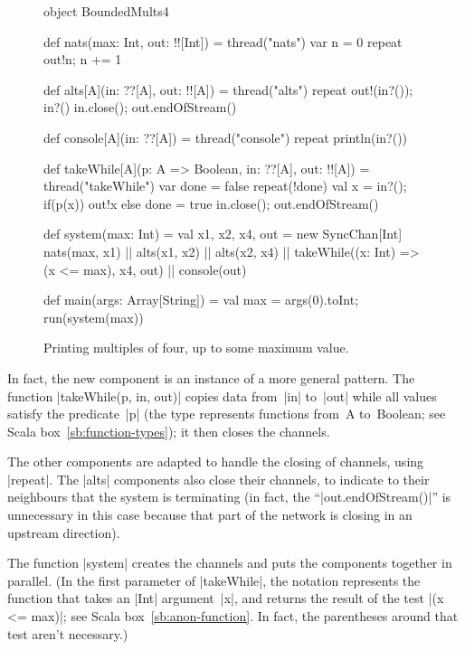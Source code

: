 
\begin{figure}
\begin{scala}
object BoundedMults4{
  def nats(max: Int, out: !![Int]) = thread("nats"){ 
    var n = 0
    repeat{ out!n; n += 1 }
  }

  def alts[A](in: ??[A], out: !![A]) = thread("alts"){ 
    repeat{ out!(in?()); in?() }
    in.close(); out.endOfStream()
  }

  def console[A](in: ??[A]) = thread("console"){ repeat{ println(in?()) } }

  def takeWhile[A](p: A => Boolean, in: ??[A], out: !![A]) = thread("takeWhile"){
    var done = false
    repeat(!done){ val x = in?(); if(p(x)) out!x else done = true }
    in.close(); out.endOfStream()
  }

  def system(max: Int) = {
    val x1, x2, x4, out = new SyncChan[Int]
    nats(max, x1) || alts(x1, x2) || alts(x2, x4) || 
      takeWhile((x: Int) => (x <= max), x4, out) || console(out)
  }

  def main(args: Array[String]) = {
    val max = args(0).toInt; run(system(max))
  }
}
\end{scala}
\caption{Printing multiples of four, up to some maximum value.}
\label{fig:BoundedMults4}
\end{figure}


In fact, the new component is an instance of a more general pattern.  The
function |takeWhile(p, in, out)| copies data from~|in| to~|out| while all
values satisfy the predicate~|p| (the type \protect{}
represents functions from~{\scalashape A} to~{\scalashape Boolean}; see Scala
box~\ref{sb:function-types}); it then closes the channels.

The other components are adapted to handle the closing of channels, using
|repeat|.  The |alts| components also close their channels, to indicate to
their neighbours that the system is terminating (in fact, the
``|out.endOfStream()|'' is unnecessary in this case because that part of the
network is closing in an upstream direction). 

The function |system| creates the channels and puts the components together in
parallel.  (In the first parameter of |takeWhile|, the notation  represents the function that takes an |Int|
argument~|x|, and returns the result of the test |(x <= max)|; see Scala
box~\ref{sb:anon-function}.  In fact, the
parentheses around that test aren't necessary.)

